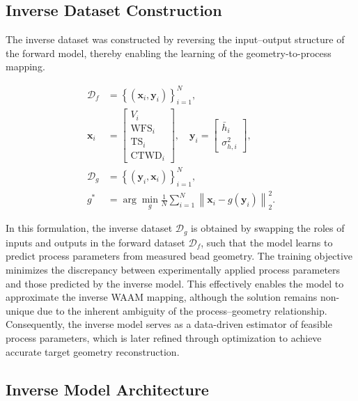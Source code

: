 \documentclass[11pt]{article}
\begin{document}
\subsection{Inverse Dataset Construction}

The inverse dataset was constructed by reversing the input--output structure of the forward model, thereby enabling the learning of the geometry-to-process mapping.

\begin{tcolorbox}[colback=white,colframe=black,boxrule=0.5pt,arc=2pt]
\begin{equation}
\begin{aligned}
\mathcal{D}_{f} &= \left\{(\mathbf{x}_i,\mathbf{y}_i)\right\}_{i=1}^{N}, \\
\mathbf{x}_i &= 
\begin{bmatrix}
V_i \\
\mathrm{WFS}_i \\
\mathrm{TS}_i \\
\mathrm{CTWD}_i
\end{bmatrix}, \quad
\mathbf{y}_i =
\begin{bmatrix}
\bar{h}_i \\
\sigma_{h,i}^{2}
\end{bmatrix}, \\
\mathcal{D}_{g} &= \left\{(\mathbf{y}_i,\mathbf{x}_i)\right\}_{i=1}^{N}, \\
g^{*} &= \arg\min_{g}
\frac{1}{N}
\sum_{i=1}^{N}
\left\|
\mathbf{x}_i - g(\mathbf{y}_i)
\right\|_2^2.
\end{aligned}
\end{equation}
\end{tcolorbox}

In this formulation, the inverse dataset $\mathcal{D}_{g}$ is obtained by swapping the roles of inputs and outputs in the forward dataset $\mathcal{D}_{f}$, such that the model learns to predict process parameters from measured bead geometry. The training objective minimizes the discrepancy between experimentally applied process parameters and those predicted by the inverse model. This effectively enables the model to approximate the inverse WAAM mapping, although the solution remains non-unique due to the inherent ambiguity of the process--geometry relationship. Consequently, the inverse model serves as a data-driven estimator of feasible process parameters, which is later refined through optimization to achieve accurate target geometry reconstruction.

\subsection{Inverse Model Architecture}
\end{document}
